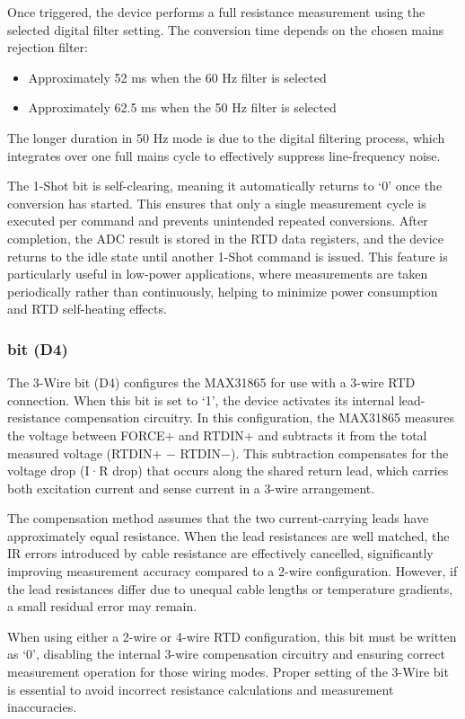 Once triggered, the device performs a full resistance measurement using the selected digital filter setting. The conversion time depends on the chosen mains rejection filter:
\begin{itemize}
\item Approximately 52 ms when the 60 Hz filter is selected
\item Approximately 62.5 ms when the 50 Hz filter is selected
\end{itemize}

The longer duration in 50 Hz mode is due to the digital filtering process, which integrates over one full mains cycle to effectively suppress line-frequency noise.

The 1-Shot bit is self-clearing, meaning it automatically returns to ‘0’ once the conversion has started. This ensures that only a single measurement cycle is executed per command and prevents unintended repeated conversions. After completion, the ADC result is stored in the RTD data registers, and the device returns to the idle state until another 1-Shot command is issued.
This feature is particularly useful in low-power applications, where measurements are taken periodically rather than continuously, helping to minimize power consumption and RTD self-heating effects.

\subsubsection{bit (D4)}
The 3-Wire bit (D4) configures the MAX31865 for use with a 3-wire RTD connection. When this bit is set to ‘1’, the device activates its internal lead-resistance compensation circuitry. In this configuration, the MAX31865 measures the voltage between FORCE+ and RTDIN+ and subtracts it from the total measured voltage (RTDIN+ − RTDIN−). This subtraction compensates for the voltage drop (I·R drop) that occurs along the shared return lead, which carries both excitation current and sense current in a 3-wire arrangement.

The compensation method assumes that the two current-carrying leads have approximately equal resistance. When the lead resistances are well matched, the IR errors introduced by cable resistance are effectively cancelled, significantly improving measurement accuracy compared to a 2-wire configuration. However, if the lead resistances differ due to unequal cable lengths or temperature gradients, a small residual error may remain.

When using either a 2-wire or 4-wire RTD configuration, this bit must be written as ‘0’, disabling the internal 3-wire compensation circuitry and ensuring correct measurement operation for those wiring modes. Proper setting of the 3-Wire bit is essential to avoid incorrect resistance calculations and measurement inaccuracies.


